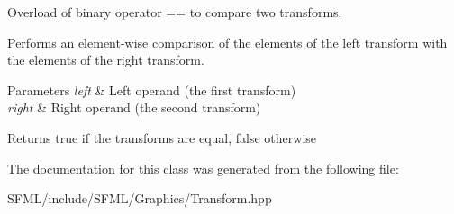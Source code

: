Overload of binary operator == to compare two transforms. 

Performs an element-\/wise comparison of the elements of the left transform with the elements of the right transform.


\begin{DoxyParams}{Parameters}
{\em left} & Left operand (the first transform) \\
\hline
{\em right} & Right operand (the second transform)\\
\hline
\end{DoxyParams}
\begin{DoxyReturn}{Returns}
true if the transforms are equal, false otherwise \begin{DoxyVerb}\end{DoxyVerb}
 
\end{DoxyReturn}


The documentation for this class was generated from the following file\+:\begin{DoxyCompactItemize}
\item 
S\+F\+M\+L/include/\+S\+F\+M\+L/\+Graphics/Transform.\+hpp\end{DoxyCompactItemize}
